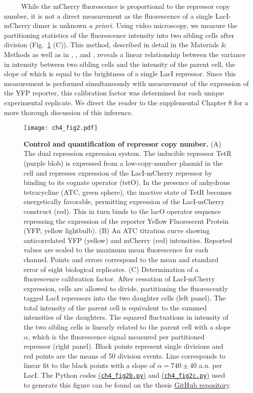 \documentclass[12pt]{caltech_thesis}
\begin{document}
~~~~~While the mCherry fluorescence is proportional to the repressor
copy number, it is not a direct measurement as the fluorescence of a
single LacI-mCherry dimer is unknown \emph{a priori}. Using video
microscopy, we measure the partitioning statistics of the fluorescence
intensity into two sibling cells after division
(Fig.~\ref{fig:dilution_circuit} (C)). This method, described in detail
in the Materials \& Methods as well as in \textcite{rosenfeld2002},
\textcite{rosenfeld2005}, and \textcite{brewster2014}, reveals a linear
relationship between the variance in intensity between two sibling cells
and the intensity of the parent cell, the slope of which is equal to the
brightness of a single LacI repressor. Since this measurement is
performed simultaneously with measurement of the expression of the YFP
reporter, this calibration factor was determined for each unique
experimental replicate. We direct the reader to the supplemental Chapter
8 for a more thorough discussion of this inference.

\hypertarget{fig:dilution_circuit}{%
\begin{figure}
\centering
\texttt{[image: ch4\_fig2.pdf]}
\caption[{Control and quantification of repressor copy number through
the binomial partitioning method.}]{\textbf{Control and quantification
of repressor copy number.} (A) The dual repression expression system.
The inducible repressor TetR (purple blob) is expressed from a
low-copy-number plasmid in the cell and represses expression of the
LacI-mCherry repressor by binding to its cognate operator (tetO). In the
presence of anhydrous tetracycline (ATC, green sphere), the inactive
state of TetR becomes energetically favorable, permitting expression of
the LacI-mCherry construct (red). This in turn binds to the lacO
operator sequence repressing the expression of the reporter Yellow
Fluorescent Protein (YFP, yellow lightbulb). (B) An ATC titration curve
showing anticorrelated YFP (yellow) and mCherry (red) intensities.
Reported values are scaled to the maximum mean fluorescence for each
channel. Points and errors correspond to the mean and standard error of
eight biological replicates. (C) Determination of a fluorescence
calibration factor. After cessation of LacI-mCherry expression, cells
are allowed to divide, partitioning the fluorescently tagged LacI
repressors into the two daughter cells (left panel). The total intensity
of the parent cell is equivalent to the summed intensities of the
daughters. The squared fluctuations in intensity of the two sibling
cells is linearly related to the parent cell with a slope \(\alpha\),
which is the fluorescence signal measured per partitioned repressor
(right panel). Black points represent single divisions and red points
are the means of 50 division events. Line corresponds to linear fit to
the black points with a slope of \(\alpha = 740 \pm 40\) a.u. per LacI.
The Python codes
\href{https://github.com/gchure/phd/blob/master/src/chapter_04/code/ch4_fig2b.py}{(\texttt{ch4\_fig2b.py})}
and
\href{https://github.com/gchure/phd/blob/master/src/chapter_04/code/ch4_fig2c.py}{(\texttt{ch4\_fig2c.py})}
used to generate this figure can be found on the thesis
\href{https://github.com/gchure/phd}{GitHub repository}.}
\label{fig:dilution_circuit}
\end{figure}
}
\end{document}
